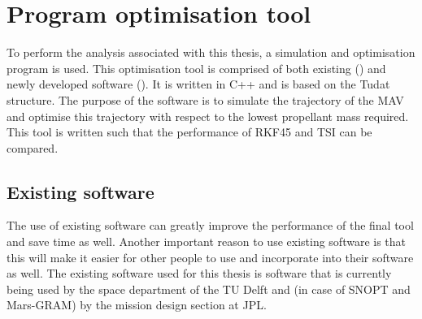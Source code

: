 \chapter{Program optimisation tool} %
\label{ch:programoptimisationtool}
To perform the analysis associated with this thesis, a simulation and optimisation program is used. This optimisation tool is comprised of both existing () and newly developed software (). It is written in C++ and is based on the \ac{Tudat} structure. The purpose of the software is to simulate the trajectory of the \ac{MAV} and optimise this trajectory with respect to the lowest propellant mass required. This tool is written such that the performance of \ac{RKF45} and \ac{TSI} can be compared.

\section{Existing software}
\label{sec:existingsoftware}
The use of existing software can greatly improve the performance of the final tool and save time as well. Another important reason to use existing software is that this will make it easier for other people to use and incorporate into their software as well. The existing software used for this thesis is software that is currently being used by the space department of the TU Delft and (in case of \ac{SNOPT} and Mars-\ac{GRAM}) by the mission design section at \ac{JPL}. 


